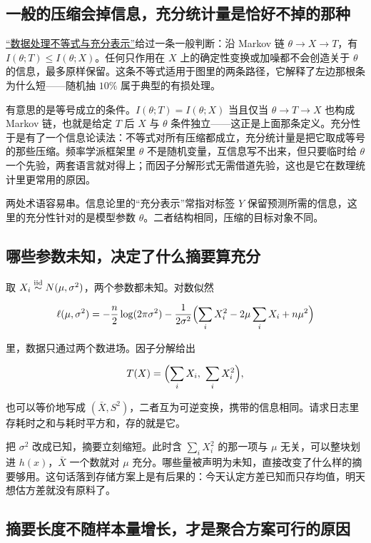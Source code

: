 \subsection{一般的压缩会掉信息，充分统计量是恰好不掉的那种}

\hyperref[sec:07-Information-Theory/02-Joint-Information/04]{``数据处理不等式与充分表示''}给过一条一般判断：沿 Markov 链 \(\theta\to X\to T\)，有 \(I(\theta;T)\le I(\theta;X)\)。任何只作用在 \(X\) 上的确定性变换或加噪都不会创造关于 \(\theta\) 的信息，最多原样保留。这条不等式适用于图里的两条路径，它解释了左边那根条为什么短——随机抽 \(10\%\) 属于典型的有损处理。

有意思的是等号成立的条件。\(I(\theta;T)=I(\theta;X)\) 当且仅当 \(\theta\to T\to X\) 也构成 Markov 链，也就是给定 \(T\) 后 \(X\) 与 \(\theta\) 条件独立——这正是上面那条定义。充分性于是有了一个信息论读法：不等式对所有压缩都成立，充分统计量是把它取成等号的那些压缩。频率学派框架里 \(\theta\) 不是随机变量，互信息写不出来，但只要临时给 \(\theta\) 一个先验，两套语言就对得上；而因子分解形式无需借道先验，这也是它在数理统计里更常用的原因。

两处术语容易串。信息论里的``充分表示''常指对标签 \(Y\) 保留预测所需的信息，这里的充分性针对的是模型参数 \(\theta\)。二者结构相同，压缩的目标对象不同。

\subsection{哪些参数未知，决定了什么摘要算充分}

取 \(X_i\overset{\mathrm{iid}}{\sim}N(\mu,\sigma^2)\)，两个参数都未知。对数似然

\[
\ell(\mu,\sigma^2)=-\frac n2\log(2\pi\sigma^2)-\frac{1}{2\sigma^2}\Bigl(\sum_i X_i^2-2\mu\sum_i X_i+n\mu^2\Bigr)
\]

里，数据只通过两个数进场。因子分解给出

\[
T(X)=\Bigl(\sum_i X_i,\ \sum_i X_i^2\Bigr),
\]

也可以等价地写成 \((\bar X,S^2)\)，二者互为可逆变换，携带的信息相同。请求日志里存耗时之和与耗时平方和，存的就是它。

把 \(\sigma^2\) 改成已知，摘要立刻缩短。此时含 \(\sum_i X_i^2\) 的那一项与 \(\mu\) 无关，可以整块划进 \(h(x)\)，\(\bar X\) 一个数就对 \(\mu\) 充分。哪些量被声明为未知，直接改变了什么样的摘要够用。这句话落到存储方案上是有后果的：今天认定方差已知而只存均值，明天想估方差就没有原料了。

\subsection{摘要长度不随样本量增长，才是聚合方案可行的原因}

